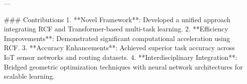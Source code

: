 ---

### Contributions
1. **Novel Framework**: Developed a unified approach integrating RCF and Transformer-based multi-task learning.
2. **Efficiency Improvements**: Demonstrated significant computational acceleration using RCF.
3. **Accuracy Enhancements**: Achieved superior task accuracy across IoT sensor networks and routing datasets.
4. **Interdisciplinary Integration**: Bridged geometric optimization techniques with neural network architectures for scalable learning.

